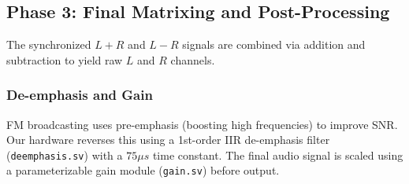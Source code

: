 \subsection{Phase 3: Final Matrixing and Post-Processing}
The synchronized $L+R$ and $L-R$ signals are combined via addition and subtraction to yield raw $L$ and $R$ channels.

\subsubsection{De-emphasis and Gain}
FM broadcasting uses pre-emphasis (boosting high frequencies) to improve SNR. Our hardware reverses this using a 1st-order IIR de-emphasis filter (\texttt{deemphasis.sv}) with a $75 \mu s$ time constant. The final audio signal is scaled using a parameterizable gain module (\texttt{gain.sv}) before output.
